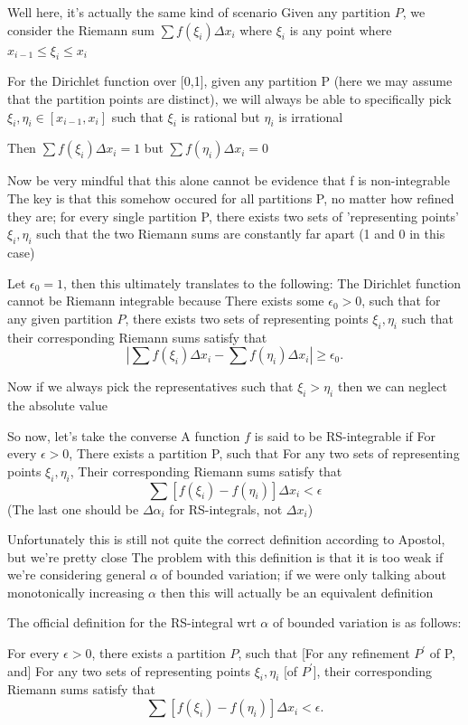 Well here, it's actually the same kind of scenario
Given any partition $P$, we consider the Riemann sum $\sum f(\xi_i)\Delta x_i$ where $\xi_i$ is any point where $x_{i-1}\le\xi_i\le x_i$

For the Dirichlet function over [0,1], given any partition P (here we may assume that the partition points are distinct), we will always be able to specifically pick $\xi_i,\eta_i\in[x_{i-1},x_i]$ such that $\xi_i$ is rational but $\eta_i$ is irrational

Then $\sum f(\xi_i)\Delta x_i=1$ but $\sum f(\eta_i)\Delta x_i=0$

Now be very mindful that this alone cannot be evidence that f is non-integrable
The key is that this somehow occured for all partitions P, no matter how refined they are; for every single partition P, there exists two sets of 'representing points' $\xi_i,\eta_i$ such that the two Riemann sums are constantly far apart (1 and 0 in this case)

Let $\epsilon_0=1$, then this ultimately translates to the following:
The Dirichlet function cannot be Riemann integrable because
There exists some $\epsilon_0>0$, such that for any given partition $P$, there exists two sets of representing points $\xi_i,\eta_i$ such that their corresponding Riemann sums satisfy that
\[ |\sum f(\xi_i)\Delta x_i - \sum f(\eta_i)\Delta x_i|\ge\epsilon_0. \]

Now if we always pick the representatives such that $\xi_i>\eta_i$ then we can neglect the absolute value

So now, let's take the converse
A function $f$ is said to be RS-integrable if
For every $\epsilon>0$,
There exists a partition P, such that
For any two sets of representing points $\xi_i,\eta_i$,
Their corresponding Riemann sums satisfy that
\[ \sum[f(\xi_i)-f(\eta_i)]\Delta x_i<\epsilon \]
(The last one should be $\Delta \alpha_i$ for RS-integrals, not $\Delta x_i$)

Unfortunately this is still not quite the correct definition according to Apostol, but we're pretty close
The problem with this definition is that it is too weak if we're considering general $\alpha$ of bounded variation; if we were only talking about monotonically increasing $\alpha$ then this will actually be an equivalent definition

The official definition for the RS-integral wrt $\alpha$ of bounded variation is as follows:
\begin{definition}
For every $\epsilon>0$, there exists a partition $P$, such that
[For any refinement $P^\prime$ of P, and]
For any two sets of representing points $\xi_i,\eta_i$ [of $P^\prime$], their corresponding Riemann sums satisfy that
\[ \sum[f(\xi_i)-f(\eta_i)]\Delta x_i<\epsilon. \]
\end{definition}

